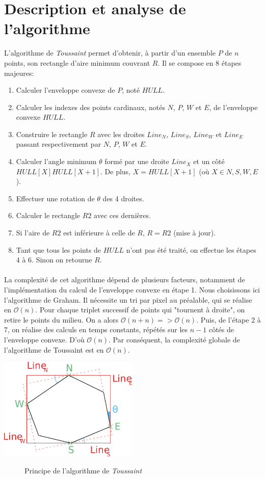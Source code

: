 \documentclass[a4paper, 12pt]{report}
\newcommand{\bigO}{\mathcal{O}}
\begin{document}
\section{Description et analyse de l'algorithme}
L'algorithme de \emph{Toussaint} permet d'obtenir, à partir d'un ensemble $P$ de $n$ points, son rectangle d'aire minimum couvrant $R$. Il se compose en 8 étapes majeures: \\
\begin{enumerate}
\item Calculer l'enveloppe convexe de $P$, noté $HULL$.
\item Calculer les indexes des points cardinaux, notés $N$, $P$, $W$ et $E$, de l'enveloppe convexe $HULL$.
\item Construire le rectangle $R$ avec les droites $Line_N$, $Line_S$, $Line_W$ et $Line_E$ passant respectivement par $N$, $P$, $W$ et $E$.
\item Calculer l'angle minimum $\theta$ formé par une droite $Line_X$ et un côté $HULL[X] HULL[X+1]$. De plus, $X=HULL[X+1]$ (où $X \in {N,S,W,E} $).
\item Effectuer une rotation de $\theta$ des 4 droites.
\item Calculer le rectangle $R2$ avec ces dernières. 
\item Si l'aire de $R2$ est inférieure à celle de $R$, $R = R2$ (mise à jour).
\item Tant que tous les points de $HULL$ n'ont pas été traité, on effectue les étapes 4 à 6. Sinon on retourne $R$. 
\end{enumerate}

\paragraph{}
La complexité de cet algorithme dépend de plusieurs facteurs, notamment de l'implémentation du calcul de l'enveloppe convexe en étape 1. Nous choisissons ici l'algorithme de Graham. Il nécessite un tri par pixel au préalable, qui se réalise en $\bigO(n)$. Pour chaque triplet successif de points qui "tournent à droite", on retire le points du milieu. On a alors $\bigO(n+n) => \bigO(n)$. Puis, de l'étape 2 à 7, on réalise des calculs en temps constants, répétés sur les $n-1$ côtés de l'enveloppe convexe. D'où $\bigO(n)$.
Par conséquent, la complexité globale de l'algorithme de Toussaint est en $\bigO(n)$.
\\
\begin{center}
\includegraphics[width=0.5\textwidth]{ToussaintSchema.pdf}
\begin{figure}[!h]
\caption{Principe de l'algorithme de \emph{Toussaint}}
\end{figure}\end{center}
\end{document}
